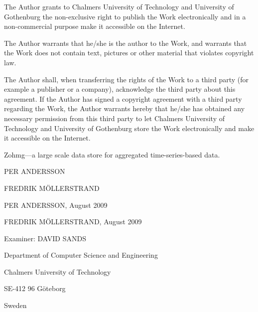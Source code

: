 \pagebreak


\setcounter{page}{1}

\noindent The Author grants to Chalmers University of Technology and University
of Gothenburg the non-exclusive right to publish the Work electronically and in
a non-commercial purpose make it accessible on the Internet.

\vspace{12pt}

\noindent The Author warrants that he/she is the author to the Work, and
warrants that the Work does not contain text, pictures or other material that
violates copyright law.

\vspace{12pt}

\noindent The Author shall, when transferring the rights of the Work to a third
party (for example a publisher or a company), acknowledge the third party about
this agreement. If the Author has signed a copyright agreement with a third
party regarding the Work, the Author warrants hereby that he/she has obtained
any necessary permission from this third party to let Chalmers University of
Technology and University of Gothenburg store the Work electronically and make
it accessible on the Internet.

\vspace{64pt}

\noindent Zohmg---a large scale data store for aggregated time-series-based
data.


\vspace{24pt}


\noindent PER ANDERSSON

\noindent FREDRIK M{\"O}LLERSTRAND


\vspace{12pt}


\noindent {\copyright} PER ANDERSSON, August 2009

\noindent {\copyright} FREDRIK M{\"O}LLERSTRAND, August 2009


\vspace{12pt}


\noindent Examiner: DAVID SANDS


\vspace{72pt}


\noindent Department of Computer Science and Engineering

\noindent Chalmers University of Technology

\noindent SE-412 96 Göteborg

\noindent Sweden

